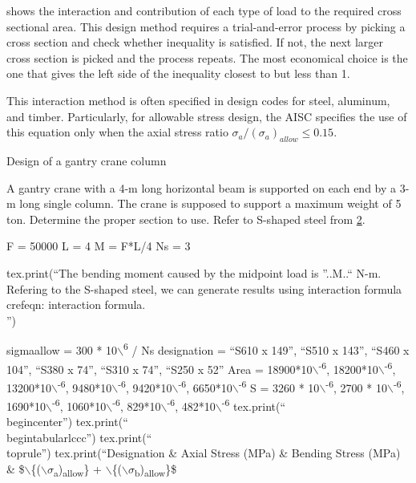 \documentclass[a4paper,openany,nobib]{tufte-book}
\begin{document}
{{\begin{enumerate}
shows the interaction and contribution of each type of load to the
required cross sectional area. This design method requires a
trial-and-error process by picking a cross section and check whether
inequality is satisfied. If not, the next larger cross section is picked
and the process repeats. The most economical choice is the one that
gives the left side of the inequality closest to but less than 1.

This interaction method is often specified in design codes for steel,
aluminum, and timber. Particularly, for allowable stress design, the
AISC specifies the use of this equation only when the axial stress ratio
\(\sigma_a / (\sigma_a)_{allow} \leq 0.15\).

Design of a gantry crane column

A gantry crane with a 4-m long horizontal beam is supported on each end
by a 3-m long single column. The crane is supposed to support a maximum
weight of 5 ton. Determine the proper section to use. Refer to S-shaped
steel from \hyperref[appendix: structural steel properties]{2}.

F = 50000 L = 4 M = F*L/4 Ns = 3

tex.print(``The bending moment caused by the midpoint load is ''..M..``
N-m. Refering to the S-shaped steel, we can generate results using
interaction formula\\
crefeqn: interaction formula.\\

'')

sigmaallow = 300 * 10$\backslash$\textsuperscript{6} / Ns designation = ``S610 x 149'', ``S510 x 143'',
``S460 x 104'', ``S380 x 74'', ``S310 x 74'', ``S250 x 52'' Area = 18900*10$\backslash$\textsuperscript{-6},
18200*10$\backslash$\textsuperscript{-6}, 13200*10$\backslash$\textsuperscript{-6}, 9480*10$\backslash$\textsuperscript{-6}, 9420*10$\backslash$\textsuperscript{-6}, 6650*10$\backslash$\textsuperscript{-6} S =
3260 * 10$\backslash$\textsuperscript{-6}, 2700 * 10$\backslash$\textsuperscript{-6}, 1690*10$\backslash$\textsuperscript{-6}, 1060*10$\backslash$\textsuperscript{-6}, 829*10$\backslash$\textsuperscript{-6},
482*10$\backslash$\textsuperscript{-6} tex.print(``\\
begincenter'') tex.print(``\\
begintabularlccc'') tex.print(``\\
toprule'') tex.print(``Designation \& Axial Stress (MPa) \& Bending Stress
(MPa) \&
\$$\backslash$\{($\backslash$\(\sigma\)\textsubscript{a})\textsubscript{allow}\} + $\backslash$\{($\backslash$\(\sigma\)\textsubscript{b})\textsubscript{allow}\}\$\\


\end{enumerate}}}
\end{document}
